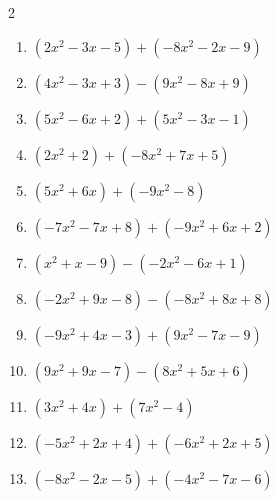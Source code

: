 \begin{multicols}{2}
\begin{enumerate}

  \item $(2x^{2}-3x-5)+(-8x^{2}-2x-9)$


  \item $(4x^{2}-3x+3)-(9x^{2}-8x+9)$


\columnbreak %

\resetques

  \item $(5x^{2}-6x+2)+(5x^{2}-3x-1)$


  \item $(2x^{2}+2)+(-8x^{2}+7x+5)$


  \item $(5x^{2}+6x)+(-9x^{2}-8)$


  \item $(-7x^{2}-7x+8)+(-9x^{2}+6x+2)$


  \item $(x^{2}+x-9)-(-2x^{2}-6x+1)$


  \item $(-2x^{2}+9x-8)-(-8x^{2}+8x+8)$


  \item $(-9x^{2}+4x-3)+(9x^{2}-7x-9)$

        \phantom{$=-3x-12$}

  \item $(9x^{2}+9x-7)-(8x^{2}+5x+6)$


  \item $(3x^{2}+4x)+(7x^{2}-4)$


  \item $(-5x^{2}+2x+4)+(-6x^{2}+2x+5)$


  \item $(-8x^{2}-2x-5)+(-4x^{2}-7x-6)$


\end{enumerate}
\end{multicols}
